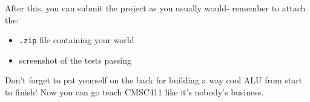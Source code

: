 \documentclass{article}
\begin{document}
After this, you can submit the project as you usually would- remember to attach the:

\begin{itemize}
  \item \texttt{.zip} file containing your world
  \item screenshot of the tests passing
\end{itemize}

Don't forget to pat yourself on the back for building a way cool ALU from start to finish!
Now you can go teach CMSC411 like it's nobody's business.
\end{document}
